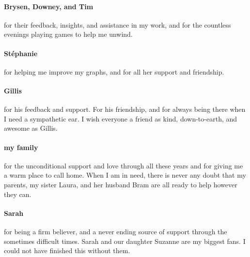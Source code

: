 \paragraph{Brysen, Downey, and Tim}
for their feedback, insights, and assistance in my work, and for the countless evenings playing games to help me unwind.

\paragraph{Stéphanie}
for helping me improve my graphs, and for all her support and friendship.

\paragraph{Gillis}
for his feedback and support. For his friendship, and for always being there when I need a sympathetic ear.
I wish everyone a friend as kind, down-to-earth, and awesome as Gillis.

\paragraph{my family}
for the unconditional support and love through all these years and for giving me a warm place to call home.
When I am in need, there is never any doubt that my parents, my sister Laura, and her husband Bram are all ready to help however they can.

\paragraph{Sarah}
for being a firm believer, and a never ending source of support through the sometimes difficult times.
Sarah and our daughter Suzanne are my biggest fans.
I could not have finished this without them.
